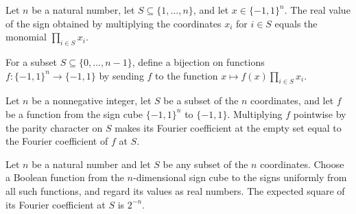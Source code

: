 \begin{theorem}
\label{FABL.signValue_randomBooleanParitySign}
\leanok
{}
Let $n$ be a natural number, let $S\subseteq\{1,\ldots,n\}$, and let $x\in\{-1,1\}^n$.
The real value of the sign obtained by multiplying the coordinates $x_i$ for $i\in S$
equals the monomial $\prod_{i\in S}x_i$.
\end{theorem}

\begin{definition}
\label{FABL.randomBooleanModulationEquiv}
\leanok
{}
For a subset $S\subseteq\{0,\ldots,n-1\}$, define a bijection on functions
$f:\{−1,1\}^n\to\{−1,1\}$ by sending $f$ to the function $x\mapsto f(x)\prod_{i\in
S}x_i$.
\end{definition}

\begin{theorem}
\label{FABL.fourierCoeff_randomBooleanModulation_empty}
\leanok
{}
Let $n$ be a nonnegative integer, let $S$ be a subset of the $n$ coordinates, and let
$f$ be a function from the sign cube $\{−1,1\}^n$ to $\{−1,1\}$. Multiplying $f$
pointwise by the parity character on $S$ makes its Fourier coefficient at the empty set
equal to the Fourier coefficient of $f$ at $S$.
\end{theorem}

\begin{theorem}
\label{FABL.expect_sq_fourierCoeff_uniformBooleanFunction}
\leanok
{}
Let $n$ be a natural number and let $S$ be any subset of the $n$ coordinates. Choose a
Boolean function from the $n$-dimensional sign cube to the signs uniformly from all such
functions, and regard its values as real numbers. The expected square of its Fourier
coefficient at $S$ is $2^{-n}$.
\end{theorem}


